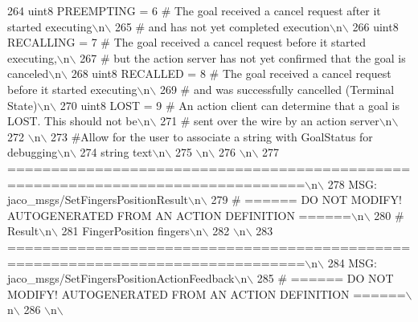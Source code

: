\begin{DoxyCode}
264 \textcolor{stringliteral}{uint8 PREEMPTING      = 6   # The goal received a cancel request after it started executing\(\backslash\)n\(\backslash\)}
265 \textcolor{stringliteral}{                            #    and has not yet completed execution\(\backslash\)n\(\backslash\)}
266 \textcolor{stringliteral}{uint8 RECALLING       = 7   # The goal received a cancel request before it started executing,\(\backslash\)n\(\backslash\)}
267 \textcolor{stringliteral}{                            #    but the action server has not yet confirmed that the goal is canceled\(\backslash\)n\(\backslash\)}
268 \textcolor{stringliteral}{uint8 RECALLED        = 8   # The goal received a cancel request before it started executing\(\backslash\)n\(\backslash\)}
269 \textcolor{stringliteral}{                            #    and was successfully cancelled (Terminal State)\(\backslash\)n\(\backslash\)}
270 \textcolor{stringliteral}{uint8 LOST            = 9   # An action client can determine that a goal is LOST. This should not be\(\backslash\)n\(\backslash\)}
271 \textcolor{stringliteral}{                            #    sent over the wire by an action server\(\backslash\)n\(\backslash\)}
272 \textcolor{stringliteral}{\(\backslash\)n\(\backslash\)}
273 \textcolor{stringliteral}{#Allow for the user to associate a string with GoalStatus for debugging\(\backslash\)n\(\backslash\)}
274 \textcolor{stringliteral}{string text\(\backslash\)n\(\backslash\)}
275 \textcolor{stringliteral}{\(\backslash\)n\(\backslash\)}
276 \textcolor{stringliteral}{\(\backslash\)n\(\backslash\)}
277 \textcolor{stringliteral}{================================================================================\(\backslash\)n\(\backslash\)}
278 \textcolor{stringliteral}{MSG: jaco\_msgs/SetFingersPositionResult\(\backslash\)n\(\backslash\)}
279 \textcolor{stringliteral}{# ====== DO NOT MODIFY! AUTOGENERATED FROM AN ACTION DEFINITION ======\(\backslash\)n\(\backslash\)}
280 \textcolor{stringliteral}{# Result\(\backslash\)n\(\backslash\)}
281 \textcolor{stringliteral}{FingerPosition fingers\(\backslash\)n\(\backslash\)}
282 \textcolor{stringliteral}{\(\backslash\)n\(\backslash\)}
283 \textcolor{stringliteral}{================================================================================\(\backslash\)n\(\backslash\)}
284 \textcolor{stringliteral}{MSG: jaco\_msgs/SetFingersPositionActionFeedback\(\backslash\)n\(\backslash\)}
285 \textcolor{stringliteral}{# ====== DO NOT MODIFY! AUTOGENERATED FROM AN ACTION DEFINITION ======\(\backslash\)n\(\backslash\)}
286 \textcolor{stringliteral}{\(\backslash\)n\(\backslash\)}

\end{DoxyCode}
